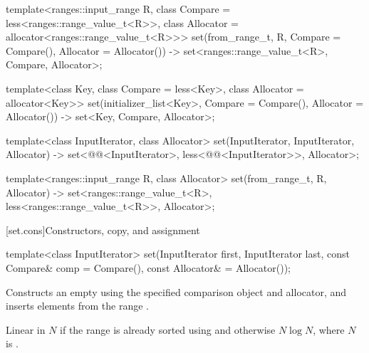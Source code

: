 \documentclass{wg21}
\begin{document}
\begin{addedblock}
\begin{codeblock}
    template<ranges::input_range R, class Compare = less<ranges::range_value_t<R>>, 
        class Allocator = allocator<ranges::range_value_t<R>>>
    set(from_range_t, R, Compare = Compare(), Allocator = Allocator())
    -> set<ranges::range_value_t<R>,  Compare, Allocator>;
\end{codeblock}
\end{addedblock}
\begin{codeblock}
        
    template<class Key, class Compare = less<Key>, class Allocator = allocator<Key>>
    set(initializer_list<Key>, Compare = Compare(), Allocator = Allocator())
    -> set<Key, Compare, Allocator>;
    
    template<class InputIterator, class Allocator>
    set(InputIterator, InputIterator, Allocator)
    -> set<@@<InputIterator>,
    less<@@<InputIterator>>, Allocator>;
       
\end{codeblock}
\begin{addedblock}
\begin{codeblock}
    template<ranges::input_range R,  class Allocator>
    set(from_range_t, R, Allocator)
    -> set<ranges::range_value_t<R>,  less<ranges::range_value_t<R>>, Allocator>;
\end{codeblock}
\end{addedblock}
\begin{codeblock}

    template<class Key, class Allocator>
    set(initializer_list<Key>, Allocator) -> set<Key, less<Key>, Allocator>;
}
\end{codeblock}%
%

[set.cons]{Constructors, copy, and assignment}

%
\begin{itemdecl}
    template<class InputIterator>
    set(InputIterator first, InputIterator last,
    const Compare& comp = Compare(), const Allocator& = Allocator());
\end{itemdecl}

\begin{itemdescr}
    \pnum
    \effects
    Constructs an empty
    using the specified comparison object and allocator,
    and inserts elements from the range
    .
    
    \pnum
    \complexity
    Linear in $N$ if the range
    is already sorted using 
    and otherwise $N \log N$,
    where $N$ is
    .
\end{itemdescr}
\end{document}
